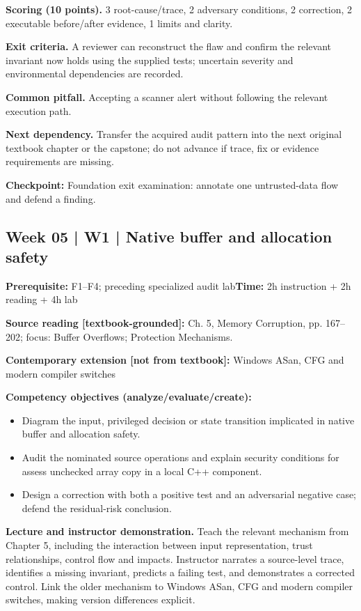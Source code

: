 \documentclass[10pt,letterpaper]{article}
\begin{document}
\textbf{Scoring (10 points).} 3 root-cause/trace, 2 adversary conditions, 2 correction, 2 executable before/after evidence, 1 limits and clarity.

\textbf{Exit criteria.} A reviewer can reconstruct the flaw and confirm the relevant invariant now holds using the supplied tests; uncertain severity and environmental dependencies are recorded.

\textbf{Common pitfall.} Accepting a scanner alert without following the relevant execution path.

\textbf{Next dependency.} Transfer the acquired audit pattern into the next original textbook chapter or the capstone; do not advance if trace, fix or evidence requirements are missing.

\begin{historynote}\textbf{Checkpoint:} Foundation exit examination: annotate one untrusted-data flow and defend a finding.\end{historynote}
\subsection{Week 05 | W1 | Native buffer and allocation safety}
\textbf{Prerequisite:} F1--F4; preceding specialized audit lab\hfill\textbf{Time:} 2h instruction + 2h reading + 4h lab

\textbf{Source reading [textbook-grounded]:} Ch. 5, Memory Corruption, pp. 167--202; focus: Buffer Overflows; Protection Mechanisms.

\textbf{Contemporary extension [not from textbook]:} Windows ASan, CFG and modern compiler switches

\textbf{Competency objectives (analyze/evaluate/create):}
\begin{itemize}[leftmargin=*,itemsep=2pt]
\item Diagram the input, privileged decision or state transition implicated in native buffer and allocation safety.
\item Audit the nominated source operations and explain security conditions for assess unchecked array copy in a local C++ component.
\item Design a correction with both a positive test and an adversarial negative case; defend the residual-risk conclusion.
\end{itemize}
\textbf{Lecture and instructor demonstration.} Teach the relevant mechanism from Chapter 5, including the interaction between input representation, trust relationships, control flow and impacts. Instructor narrates a source-level trace, identifies a missing invariant, predicts a failing test, and demonstrates a corrected control. Link the older mechanism to Windows ASan, CFG and modern compiler switches, making version differences explicit.
\end{document}
